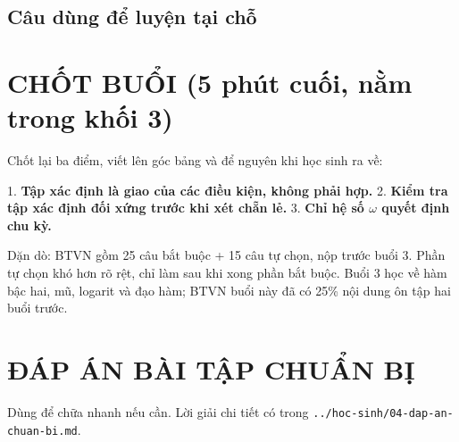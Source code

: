 \documentclass[11pt, a4paper]{article}
\begin{document}
\subsection{Câu dùng để luyện tại chỗ}


\section{CHỐT BUỔI (5 phút cuối, nằm trong khối 3)}

Chốt lại ba điểm, viết lên góc bảng và để nguyên khi học sinh ra về:

1. \textbf{Tập xác định là giao của các điều kiện, không phải hợp.}
2. \textbf{Kiểm tra tập xác định đối xứng trước khi xét chẵn lẻ.}
3. \textbf{Chỉ hệ số $\omega$ quyết định chu kỳ.}

Dặn dò: BTVN gồm 25 câu bắt buộc + 15 câu tự chọn, nộp trước buổi 3. Phần tự chọn khó hơn rõ rệt, chỉ làm sau khi xong phần bắt buộc. Buổi 3 học về hàm bậc hai, mũ, logarit và đạo hàm; BTVN buổi này đã có 25\% nội dung ôn tập hai buổi trước.

\section{ĐÁP ÁN BÀI TẬP CHUẨN BỊ}

Dùng để chữa nhanh nếu cần. Lời giải chi tiết có trong \texttt{../hoc-sinh/04-dap-an-chuan-bi.md}.

\end{document}
